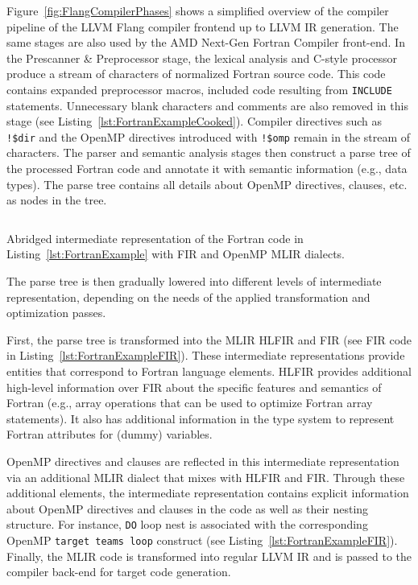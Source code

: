 \documentclass[acmtog,natbib=false]{acmart}
\newcommand{\code}[1]{\texttt{#1}\xspace}
\begin{document}
Figure~\ref{fig:FlangCompilerPhases} shows a simplified overview of the compiler pipeline of the LLVM Flang compiler frontend up to LLVM \ac{IR} generation.
The same stages are also used by the AMD Next-Gen Fortran Compiler front-end.
In the Prescanner \& Preprocessor stage, the lexical analysis and C-style processor produce a stream of characters of normalized Fortran source code. 
This code contains expanded preprocessor macros, included code resulting from \code{INCLUDE} statements. Unnecessary blank characters and comments are also removed in this stage (see Listing~\ref{lst:FortranExampleCooked}).
Compiler directives such as \code{!\$dir} and the OpenMP directives introduced with \code{!\$omp} remain in the stream of characters.
The parser and semantic analysis stages then construct a parse tree of the processed Fortran code and annotate it with semantic information (e.g., data types).
The parse tree contains all details about OpenMP directives, clauses, etc. as nodes in the tree.

\begin{listing}[t]
\inputminted{MLIR-lexer.py:MlirLexer -x}{code/tgt_loop_abridged.fir}
\caption{Abridged intermediate representation of the Fortran code in Listing~\ref{lst:FortranExample} with \acs{FIR} and OpenMP \acs{MLIR} dialects.}
\label{lst:FortranExampleFIR}
\end{listing}

The parse tree is then gradually lowered into different levels of intermediate representation, depending on the needs of the applied transformation and optimization passes.

First, the parse tree is transformed into the \ac{MLIR} \ac{HLFIR} and \ac{FIR} (see \ac{FIR} code in  Listing~\ref{lst:FortranExampleFIR}).
These intermediate representations provide entities that correspond to Fortran language elements.
\Ac{HLFIR} provides additional high-level information over \ac{FIR} about the specific features and semantics of Fortran (e.g., array operations that can be used to optimize Fortran array statements).
It also has additional information in the type system to represent Fortran attributes for (dummy) variables.

OpenMP directives and clauses are reflected in this intermediate representation via an additional \ac{MLIR} dialect that mixes with \ac{HLFIR} and \ac{FIR}.
Through these additional elements, the intermediate representation contains explicit information about  OpenMP directives and clauses in the code as well as their nesting structure.
For instance, \code{DO} loop nest is associated with the corresponding OpenMP \code{target teams loop} construct (see Listing~\ref{lst:FortranExampleFIR}).
Finally, the \ac{MLIR} code is transformed into regular LLVM \ac{IR} and is passed to the compiler back-end for target code generation.
\end{document}
